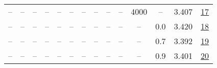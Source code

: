 \begin{table}[H]
\begin{tabular}{cccccccccccccc}
-- & -- & -- & -- & -- & -- & -- & -- & -- & -- & 4000 & -- & 3.407 & \href{https://wandb.ai/stanford-mercury/optimizer-scaling/runs/sweep-130m-5B-kron16e6c3lr0.002-wd0.5-b10.95-plr0.2-pis1-gn1-nor-d79e88}{17} \\
-- & -- & -- & -- & -- & -- & -- & -- & -- & -- & -- & 0.0 & 3.420 & \href{https://wandb.ai/stanford-mercury/optimizer-scaling/runs/sweep-130m-5B-kron7554eclr0.002-wd0.0-b10.95-plr0.2-pis1-gn1-nor-068703}{18} \\
-- & -- & -- & -- & -- & -- & -- & -- & -- & -- & -- & 0.7 & 3.392 & \href{https://wandb.ai/stanford-mercury/optimizer-scaling/runs/sweep-130m-5B-kron21448alr0.002-wd0.7-b10.95-plr0.2-pis1-gn1-nor-9b5416}{19} \\
-- & -- & -- & -- & -- & -- & -- & -- & -- & -- & -- & 0.9 & 3.401 & \href{https://wandb.ai/stanford-mercury/optimizer-scaling/runs/sweep-130m-5B-kron8b782elr0.002-wd0.9-b10.95-plr0.2-pis1-gn1-nor-f63969}{20} \\
\bottomrule
\end{tabular}
\end{table}

